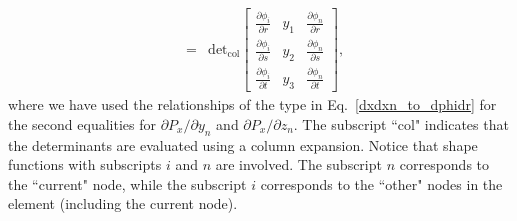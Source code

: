 \begin{eqnarray}
&=& \text{det}_{\text{col}} \begin{bmatrix}
\frac{\partial \phi_i}{\partial r} & y_1 & \frac{\partial \phi_n}{\partial r}  \\
\frac{\partial \phi_i}{\partial s} & y_2 & \frac{\partial \phi_n}{\partial s} \\
\frac{\partial \phi_i}{\partial t} & y_3 & \frac{\partial \phi_n}{\partial t}  
\end{bmatrix} ,
%
\label{dPx}
\end{eqnarray}
%
where we have used the relationships of the type in Eq.\ \eqref{dxdxn_to_dphidr} for the second equalities for $\partial P_x/\partial y_n$ and $\partial P_x/ \partial z_n$. The subscript ``col" indicates that the determinants are evaluated using a column expansion. Notice that shape functions with subscripts $i$ and $n$ are involved. The subscript $n$ corresponds to the ``current" node, while the subscript $i$ corresponds to the ``other" nodes in the element (including the current node).

